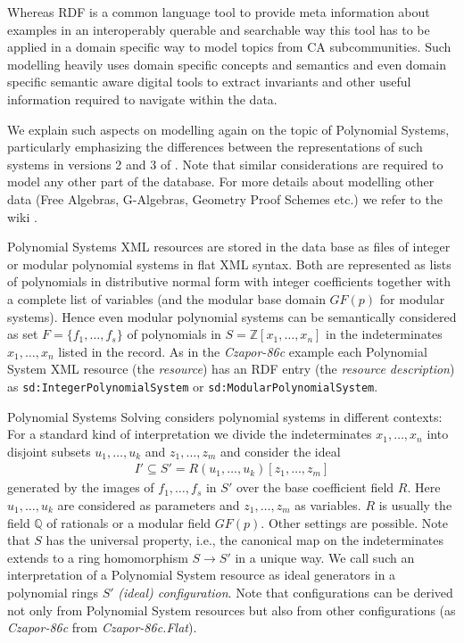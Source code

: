 \documentclass[a4paper,11pt]{article}
\begin{document}
\begin{multicols}{2}

Whereas RDF is a common language tool to provide meta information about
examples in an interoperably querable and searchable way this tool has to be
applied in a domain specific way to model topics from CA subcommunities.
Such modelling heavily uses domain specific concepts and semantics and even
domain specific semantic aware digital tools to extract invariants and other
useful information required to navigate within the data. 

We explain such aspects on {\SD} modelling again on the topic of Polynomial
Systems, particularly emphasizing the differences between the representations
of such systems in versions 2 and 3 of {\SD}. Note that similar considerations
are required to model any other part of the {\SD} database. For more details
about modelling other data (Free Algebras, G-Algebras, Geometry Proof Schemes
etc.) we refer to the {\SD} wiki \cite{sdwiki}.

Polynomial Systems XML resources are stored in the {\SD} data base as files of
integer or modular polynomial systems in flat XML syntax.  Both are represented
as lists of polynomials in distributive normal form with integer coefficients
together with a complete list of variables (and the modular base domain $GF(p)$
for modular systems). Hence even modular polynomial systems can be semantically
considered as set $F=\{f_1,\dots,f_s\}$ of polynomials in
$S=\mathbb{Z}[x_1,\dots,x_n]$ in the indeterminates $x_1,\dots,x_n$ listed in
the record.  As in the \emph{Czapor-86c} example each Polynomial System XML
resource (the \emph{resource}\/) has an RDF entry (the \emph{resource
  description}\/) as \texttt{sd:IntegerPolynomialSystem} or
\texttt{sd:ModularPolynomialSystem}.

Polynomial Systems Solving considers polynomial systems in different contexts:
For a standard kind of interpretation we divide the indeterminates
$x_1,\dots,x_n$ into disjoint subsets $u_1,\dots,u_k$ and $z_1,\dots,z_m$ and
consider the ideal
\begin{gather*}
I'\subseteq S'=R(u_1,\dots,u_k)[z_1,\dots,z_m]
\end{gather*}
generated by the images of $f_1,\dots,f_s$ in $S'$ over the base coefficient
field $R$.  Here $u_1,\dots,u_k$ are considered as parameters and
$z_1,\dots,z_m$ as variables. $R$ is usually the field $\mathbb{Q}$ of
rationals or a modular field $GF(p)$. Other settings are possible. Note that
$S$ has the universal property, i.e., the canonical map on the indeterminates
extends to a ring homomorphism $S\rightarrow S'$ in a unique way.  We call
such an interpretation of a Polynomial System resource as ideal generators in
a polynomial rings $S'$ \emph{(ideal) configuration}.  Note that
configurations can be derived not only from Polynomial System resources but
also from other configurations (as \emph{Czapor-86c} from
\emph{Czapor-86c.Flat}).


\end{multicols}
\end{document}
